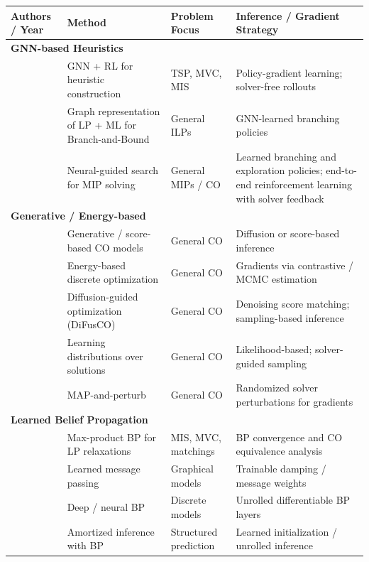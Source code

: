 \begin{table}[htbp]
\centering
\small
\setlength{\tabcolsep}{4pt}
\renewcommand{\arraystretch}{1.08}
\begin{tabular}{|p{2.6cm}|p{4.2cm}|p{2.8cm}|p{4.6cm}|}
\hline
\textbf{Authors / Year} & \textbf{Method} & \textbf{Problem Focus} & \textbf{Inference / Gradient Strategy} \\
\hline

\multicolumn{4}{|l|}{\textbf{GNN-based Heuristics}} \\
\hline
\cite{dai_learning_2017} & GNN + RL for heuristic construction & TSP, MVC, MIS & Policy-gradient learning; solver-free rollouts \\
\cite{gasse_exact_2019} & Graph representation of LP + ML for Branch-and-Bound & General ILPs & GNN-learned branching policies \\
\cite{nair_solving_2020} & Neural-guided search for MIP solving & General MIPs / CO & Learned branching and exploration policies; end-to-end reinforcement learning with solver feedback \\
\hline

\multicolumn{4}{|l|}{\textbf{Generative / Energy-based}} \\
\hline
\cite{caramanis_optimizing_2023} & Generative / score-based CO models & General CO & Diffusion or score-based inference \\
\cite{grathwohl_oops_nodate} & Energy-based discrete optimization & General CO & Gradients via contrastive / MCMC estimation \\
\cite{sun_difusco_2023} & Diffusion-guided optimization (DiFusCO) & General CO & Denoising score matching; sampling-based inference \\
\cite{dalle_learning_2022} & Learning distributions over solutions & General CO & Likelihood-based; solver-guided sampling \\
\cite{berthet_learning_2020} & MAP-and-perturb & General CO & Randomized solver perturbations for gradients \\
\hline

\multicolumn{4}{|l|}{\textbf{Learned Belief Propagation}} \\
\hline
\cite{park_max-product_2017} & Max-product BP for LP relaxations & MIS, MVC, matchings & BP convergence and CO equivalence analysis \\
\cite{kuck_belief_2020} & Learned message passing & Graphical models & Trainable damping / message weights \\
\cite{deng_deep_2022} & Deep / neural BP & Discrete models & Unrolled differentiable BP layers \\
\cite{wiseman_amortized_2019} & Amortized inference with BP & Structured prediction & Learned initialization / unrolled inference \\
\hline


\end{tabular}
\end{table}
